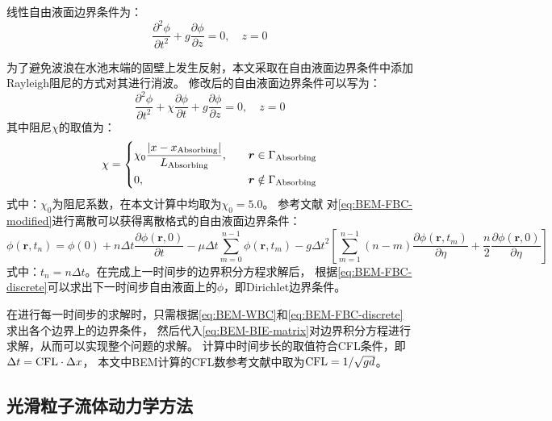 线性自由液面边界条件为：
\begin{equation}
  \frac{\partial^2\phi}{\partial t^2} + g \frac{\partial \phi}{\partial z} = 0, \quad z = 0
  \label{eq:BEM-FBC}
\end{equation}

为了避免波浪在水池末端的固壁上发生反射，本文采取在自由液面边界条件中添加Rayleigh阻尼的方式对其进行消波。%
修改后的自由液面边界条件可以写为：
\begin{equation}
  \frac{\partial^2\phi}{\partial t^2} + \chi \frac{\partial\phi}{\partial t} %
  + g \frac{\partial \phi}{\partial z} = 0, \quad z = 0
  \label{eq:BEM-FBC-modified}
\end{equation}
其中阻尼$\chi$的取值为：
\begin{equation}
  \chi = 
  \left\{
    \begin{aligned}
      & \chi_0 \frac{\left|x - x_{\rm{Absorbing}}\right|}{L_{\rm{Absorbing}}}, \quad & \bm{r} \in \Gamma_{\rm{Absorbing}} \\
      & 0, \quad & \bm{r} \notin \Gamma_{\rm{Absorbing}}
    \end{aligned}
  \right.
\end{equation}
式中：$\chi_0$为阻尼系数，在本文计算中均取为$\chi_0 = 5.0$。%
参考文献\parencite{SunErWeiZiYouMianTiaoJianHeFuSheTiaoJianDeShuZhiMoNi2004}%
对\cref{eq:BEM-FBC-modified}进行离散可以获得离散格式的自由液面边界条件：
\begin{equation}
  \phi\left(\bm{r},t_n\right) = \phi\left(0\right) %
  + n \Delta t \frac{\partial\phi\left(\bm{r},0\right)}{\partial t} %
  - \mu \Delta t \sum_{m=0}^{n-1}\phi\left(\bm{r},t_m\right) %
  - g {\Delta t}^2 \left[\sum_{m=1}^{n-1}\left(n - m\right) %
  \frac{\partial \phi\left(\bm{r},t_m\right)}{\partial \eta} %
  + \frac{n}2 \frac{\partial \phi\left(\bm{r},0\right)}{\partial \eta}\right]
  \label{eq:BEM-FBC-discrete}
\end{equation}
式中：$t_n = n \Delta t$。在完成上一时间步的边界积分方程求解后，%
根据\cref{eq:BEM-FBC-discrete}可以求出下一时间步自由液面上的$\phi$，即Dirichlet边界条件。

在进行每一时间步的求解时，只需根据\cref{eq:BEM-WBC}和\cref{eq:BEM-FBC-discrete}求出各个边界上的边界条件，%
然后代入\cref{eq:BEM-BIE-matrix}对边界积分方程进行求解，从而可以实现整个问题的求解。%
计算中时间步长的取值符合CFL条件，即$\Delta t = {\rm{CFL}} \cdot \Delta x$，%
本文中BEM计算的CFL数参考文献\parencite{SunErWeiZiYouMianTiaoJianHeFuSheTiaoJianDeShuZhiMoNi2004}中取为${\rm{CFL}} = 1/\sqrt{gd}$。

\subsection{
  \texorpdfstring{光滑粒子流体动力学方法} %
  {\thesubsection 光滑粒子流体动力学方法} %
}
\label{ssec:光滑粒子流体动力学方法}


